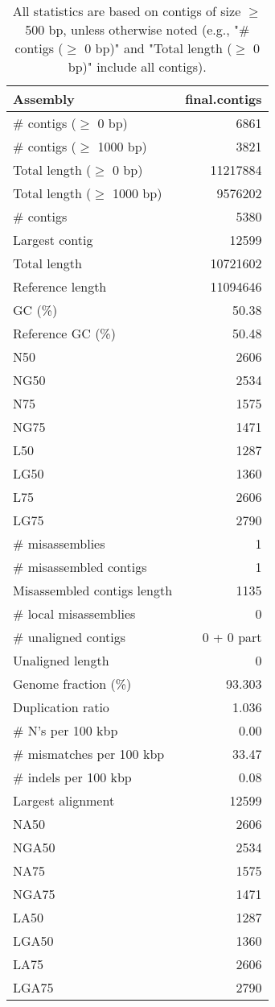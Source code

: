 \documentclass[12pt,a4paper]{article}
\begin{document}
\begin{table}[ht]
\begin{center}
\caption{All statistics are based on contigs of size $\geq$ 500 bp, unless otherwise noted (e.g., "\# contigs ($\geq$ 0 bp)" and "Total length ($\geq$ 0 bp)" include all contigs).}
\begin{tabular}{|l*{1}{|r}|}
\hline
Assembly & final.contigs \\ \hline
\# contigs ($\geq$ 0 bp) & 6861 \\ \hline
\# contigs ($\geq$ 1000 bp) & 3821 \\ \hline
Total length ($\geq$ 0 bp) & 11217884 \\ \hline
Total length ($\geq$ 1000 bp) & 9576202 \\ \hline
\# contigs & 5380 \\ \hline
Largest contig & 12599 \\ \hline
Total length & 10721602 \\ \hline
Reference length & 11094646 \\ \hline
GC (\%) & 50.38 \\ \hline
Reference GC (\%) & 50.48 \\ \hline
N50 & 2606 \\ \hline
NG50 & 2534 \\ \hline
N75 & 1575 \\ \hline
NG75 & 1471 \\ \hline
L50 & 1287 \\ \hline
LG50 & 1360 \\ \hline
L75 & 2606 \\ \hline
LG75 & 2790 \\ \hline
\# misassemblies & 1 \\ \hline
\# misassembled contigs & 1 \\ \hline
Misassembled contigs length & 1135 \\ \hline
\# local misassemblies & 0 \\ \hline
\# unaligned contigs & 0 + 0 part \\ \hline
Unaligned length & 0 \\ \hline
Genome fraction (\%) & 93.303 \\ \hline
Duplication ratio & 1.036 \\ \hline
\# N's per 100 kbp & 0.00 \\ \hline
\# mismatches per 100 kbp & 33.47 \\ \hline
\# indels per 100 kbp & 0.08 \\ \hline
Largest alignment & 12599 \\ \hline
NA50 & 2606 \\ \hline
NGA50 & 2534 \\ \hline
NA75 & 1575 \\ \hline
NGA75 & 1471 \\ \hline
LA50 & 1287 \\ \hline
LGA50 & 1360 \\ \hline
LA75 & 2606 \\ \hline
LGA75 & 2790 \\ \hline
\end{tabular}
\end{center}
\end{table}
\end{document}
